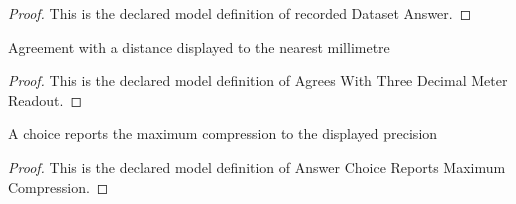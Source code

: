 \begin{proof}
  This is the declared model definition of recorded Dataset Answer.
\end{proof}
\begin{definition}
  \label{def:physics:phyx-mini-0763:phyxminiproblems-problemphyxmini0763-agreeswiththreedecimalmeterreadout}
  Agreement with a distance displayed to the nearest millimetre
\end{definition}
\begin{proof}
  This is the declared model definition of Agrees With Three Decimal Meter Readout.
\end{proof}
\begin{definition}
  \label{def:physics:phyx-mini-0763:phyxminiproblems-problemphyxmini0763-answerchoicereportsmaximumcompression}
  A choice reports the maximum compression to the displayed precision
\end{definition}
\begin{proof}
  This is the declared model definition of Answer Choice Reports Maximum Compression.
\end{proof}
